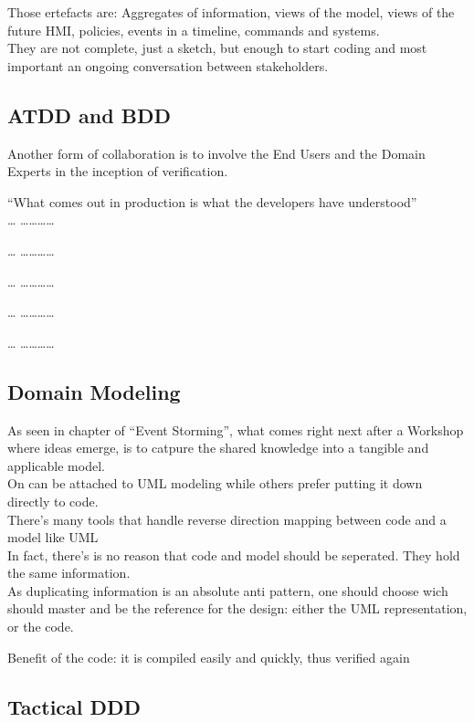Those ertefacts are: Aggregates of information, views of the model,
views of the future HMI, policies, events in a timeline, commands and
systems.\\They are not complete, just a sketch, but enough to start
coding and most important an ongoing conversation between stakeholders.

\subsection{ATDD and BDD}\label{atdd-and-bdd}

Another form of collaboration is to involve the End Users and the Domain
Experts in the inception of verification.

``What comes out in production is what the developers have
understood''\\\ldots{} \ldots{}\ldots{}\ldots{}\ldots{}

\ldots{} \ldots{}\ldots{}\ldots{}\ldots{}

\ldots{} \ldots{}\ldots{}\ldots{}\ldots{}

\ldots{} \ldots{}\ldots{}\ldots{}\ldots{}

\ldots{} \ldots{}\ldots{}\ldots{}\ldots{}

\subsection{Domain Modeling}\label{domain-modeling}

As seen in chapter of ``Event Storming'', what comes right next after a
Workshop where ideas emerge, is to catpure the shared knowledge into a
tangible and applicable model.\\On can be attached to UML modeling while
others prefer putting it down directly to code.\\There's many tools that
handle reverse direction mapping between code and a model like UML\\In
fact, there's is no reason that code and model should be seperated. They
hold the same information.\\As duplicating information is an absolute
anti pattern, one should choose wich should master and be the reference
for the design: either the UML representation, or the code.

Benefit of the code: it is compiled easily and quickly, thus verified
again

\subsection{Tactical DDD}\label{tactical-ddd}

